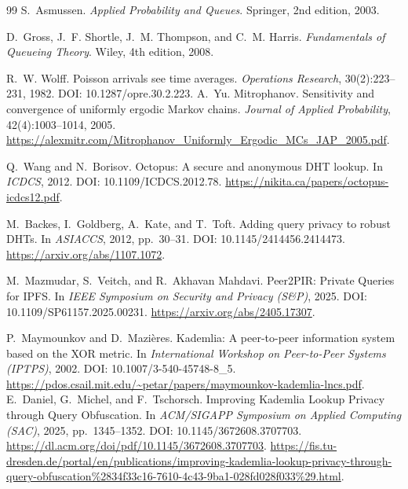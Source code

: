 \documentclass[11pt]{article}
\theoremstyle{definition}
\theoremstyle{remark}
\begin{document}
\begin{thebibliography}{99}
S.~Asmussen.
\newblock \emph{Applied Probability and Queues}.
\newblock Springer, 2nd edition, 2003.


D.~Gross, J.~F. Shortle, J.~M. Thompson, and C.~M. Harris.
\newblock \emph{Fundamentals of Queueing Theory}.
\newblock Wiley, 4th edition, 2008.

R.~W. Wolff.
\newblock Poisson arrivals see time averages.
\newblock \emph{Operations Research}, 30(2):223--231, 1982.
\newblock DOI: 10.1287/opre.30.2.223.
A.~Yu. Mitrophanov.
\newblock Sensitivity and convergence of uniformly ergodic Markov chains.
\newblock \emph{Journal of Applied Probability}, 42(4):1003--1014, 2005.
\newblock \url{https://alexmitr.com/Mitrophanov_Uniformly_Ergodic_MCs_JAP_2005.pdf}.

Q.~Wang and N.~Borisov.
\newblock Octopus: A secure and anonymous DHT lookup.
\newblock In \emph{ICDCS}, 2012.
\newblock DOI: 10.1109/ICDCS.2012.78.
\newblock \url{https://nikita.ca/papers/octopus-icdcs12.pdf}.

M.~Backes, I.~Goldberg, A.~Kate, and T.~Toft.
\newblock Adding query privacy to robust DHTs.
\newblock In \emph{ASIACCS}, 2012, pp.~30--31.
\newblock DOI: 10.1145/2414456.2414473. \url{https://arxiv.org/abs/1107.1072}.


M.~Mazmudar, S.~Veitch, and R.~Akhavan Mahdavi.
\newblock Peer2PIR: Private Queries for IPFS.
\newblock In \emph{IEEE Symposium on Security and Privacy (S\&P)}, 2025.
\newblock DOI: 10.1109/SP61157.2025.00231.
\newblock \url{https://arxiv.org/abs/2405.17307}.

P.~Maymounkov and D.~Mazi\`eres.
\newblock Kademlia: A peer-to-peer information system based on the XOR metric.
\newblock In \emph{International Workshop on Peer-to-Peer Systems (IPTPS)}, 2002.
\newblock DOI: 10.1007/3-540-45748-8\_5. \url{https://pdos.csail.mit.edu/~petar/papers/maymounkov-kademlia-lncs.pdf}.
E.~Daniel, G.~Michel, and F.~Tschorsch.
\newblock Improving Kademlia Lookup Privacy through Query Obfuscation.
\newblock In \emph{ACM/SIGAPP Symposium on Applied Computing (SAC)}, 2025, pp.~1345--1352.
\newblock DOI: 10.1145/3672608.3707703.
\newblock \url{https://dl.acm.org/doi/pdf/10.1145/3672608.3707703}.
\newblock \url{https://fis.tu-dresden.de/portal/en/publications/improving-kademlia-lookup-privacy-through-query-obfuscation%2834f33c16-7610-4c43-9ba1-028fd028f033%29.html}.


\end{thebibliography}
\end{document}
